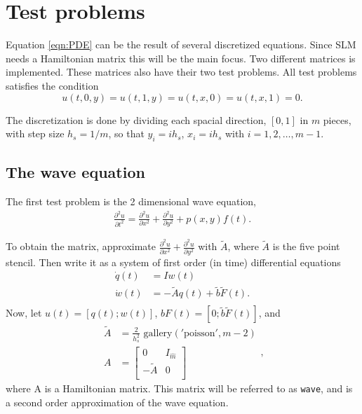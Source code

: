 \section{Test problems} %
\label{sec:testprob}

Equation \eqref{eqn:PDE} can be the result of several discretized equations. Since SLM needs a Hamiltonian matrix this will be the main focus. Two different matrices is implemented. These matrices also have their two test problems. All test problems satisfies the condition $$u(t,0,y) = u(t,1,y) = u(t,x,0) = u(t,x,1) = 0.$$ 

The discretization is done by dividing each spacial direction, $[0,1]$ in $m$ pieces, with step size $h_s = 1/m$, so that $y_i = i h_s$, $x_i = i h_s$ with $i = 1,2,\dots,m-1 $. 

\subsection{The wave equation} %

The first test problem is the 2 dimensional wave equation, 
\begin{equation}
\begin{aligned}
\frac{\partial^2 u}{\partial t^2} = \frac{\partial^2 u}{\partial x^2}+ \frac{\partial^2 u}{\partial y^2} + p(x,y)f(t).
\end{aligned}
\label{eqn:wave}
\end{equation}

To obtain the matrix, approximate $\frac{\partial^2 u}{\partial x^2}+ \frac{\partial^2 u}{\partial y^2}$ with $\tilde{A}$, where $\tilde{A}$ is the five point stencil\cite{fivepoint}. Then write it as a system of first order (in time) differential equations
\begin{equation}
\begin{aligned}
\dot{q}(t) &= I w(t) \\
\dot{w}(t) & = -\tilde{A} q(t) + \tilde{b} \tilde{F}(t). \\
\end{aligned}
\end{equation}
Now, let $u(t) = [q(t);w(t)]$, $ b F(t) =[0; \tilde{b} \tilde{F}(t)] $, and
\begin{equation}
\begin{aligned}
\tilde{A} &= \frac{2}{h_s^2} \text{ gallery}('\text{poisson}', m-2) \\
A &= 
\begin{bmatrix}
 0 & I_{\hat{m}} \\ - \tilde{A} & 0 \\
\end{bmatrix}
\end{aligned},
\end{equation}
where A is a Hamiltonian matrix. This matrix will be referred to as \texttt{wave}, and is a second order approximation of the wave equation. %

